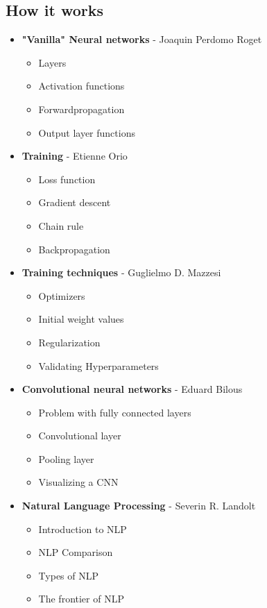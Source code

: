 \documentclass[12pt]{article}
\begin{document}
 \subsection{How it works}
 \begin{itemize}[label=$\bullet$]
     \item \textbf{"Vanilla" Neural networks} - Joaquin Perdomo Roget
     \begin{itemize}[label=$\circ$]
         \item Layers
         \item Activation functions
         \item Forwardpropagation
         \item Output layer functions
     \end{itemize}
     \item \textbf{Training} - Etienne Orio
     \begin{itemize}[label=$\circ$]
         \item Loss function
         \item Gradient descent
         \item Chain rule
         \item Backpropagation
     \end{itemize}     
     \item \textbf{Training techniques} - Guglielmo D. Mazzesi
     \begin{itemize}[label=$\circ$]
         \item Optimizers
         \item Initial weight values
         \item Regularization
         \item Validating Hyperparameters
     \end{itemize}     
     \item \textbf{Convolutional neural networks} - Eduard Bilous
     \begin{itemize}[label=$\circ$]
         \item Problem with fully connected layers
         \item Convolutional layer
         \item Pooling layer
         \item Visualizing a CNN
     \end{itemize}     
     \item \textbf{Natural Language Processing} - Severin R. Landolt
     \begin{itemize}[label=$\circ$]
         \item Introduction to NLP
         \item NLP Comparison
         \item Types of NLP
         \item The frontier of NLP
     \end{itemize}          
 \end{itemize}
 
\end{document}
